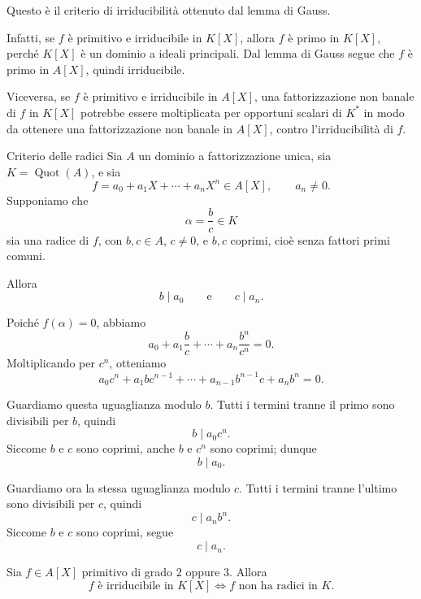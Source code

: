 \documentclass[a4paper]{article}
\begin{document}
\begin{snippetproof}{}
    Questo è il criterio di irriducibilità ottenuto dal lemma di Gauss.

    Infatti, se \(f\) è primitivo e irriducibile in \(K[X]\), allora \(f\) è primo in \(K[X]\), perché \(K[X]\) è un dominio a ideali principali.
    Dal lemma di Gauss segue che \(f\) è primo in \(A[X]\), quindi irriducibile.

    Viceversa, se \(f\) è primitivo e irriducibile in \(A[X]\), una fattorizzazione non banale di \(f\) in \(K[X]\) potrebbe essere moltiplicata per opportuni scalari di \(K^\ast\) in modo da ottenere una fattorizzazione non banale in \(A[X]\), contro l'irriducibilità di \(f\).
\end{snippetproof}

\begin{snippetproposition}{Criterio delle radici}
    Sia \(A\) un dominio a fattorizzazione unica, sia \(K=\operatorname{Quot}(A)\), e sia
    \[
        f=a_0+a_1X+\cdots+a_nX^n\in A[X],
        \qquad
        a_n\neq 0.
    \]
    Supponiamo che
    \[
        \alpha=\frac{b}{c}\in K
    \]
    sia una radice di \(f\), con \(b,c\in A\), \(c\neq 0\), e \(b,c\) coprimi, cioè senza fattori primi comuni.

    Allora
    \[
        b\mid a_0
        \qquad
        \text{e}
        \qquad
        c\mid a_n.
    \]
\end{snippetproposition}

\begin{snippetproof}{}
    Poiché \(f(\alpha)=0\), abbiamo
    \[
        a_0+a_1\frac{b}{c}+\cdots+a_n\frac{b^n}{c^n}=0.
    \]
    Moltiplicando per \(c^n\), otteniamo
    \[
        a_0c^n+a_1bc^{n-1}+\cdots+a_{n-1}b^{n-1}c+a_nb^n=0.
    \]

    Guardiamo questa uguaglianza modulo \(b\). Tutti i termini tranne il primo sono divisibili per \(b\), quindi
    \[
        b\mid a_0c^n.
    \]
    Siccome \(b\) e \(c\) sono coprimi, anche \(b\) e \(c^n\) sono coprimi; dunque
    \[
        b\mid a_0.
    \]

    Guardiamo ora la stessa uguaglianza modulo \(c\). Tutti i termini tranne l'ultimo sono divisibili per \(c\), quindi
    \[
        c\mid a_nb^n.
    \]
    Siccome \(b\) e \(c\) sono coprimi, segue
    \[
        c\mid a_n.
    \]
\end{snippetproof}

\begin{snippetcorollary}{}
    Sia \(f\in A[X]\) primitivo di grado \(2\) oppure \(3\).
    Allora
    \[
        f \text{ è irriducibile in } K[X]
        \iff
        f \text{ non ha radici in } K.
    \]
\end{snippetcorollary}
\end{document}
